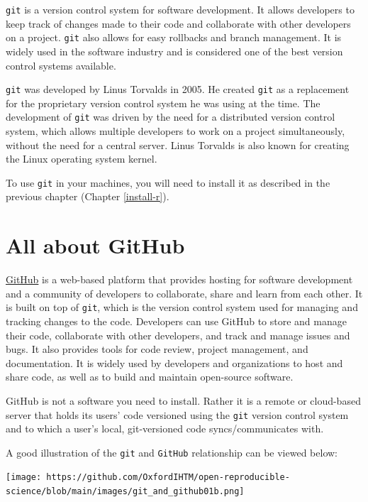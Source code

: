 \documentclass[
  12pt,
]{book}
\begin{document}
\texttt{git} is a version control system for software development. It allows developers to keep track of changes made to their code and collaborate with other developers on a project. \texttt{git} also allows for easy rollbacks and branch management. It is widely used in the software industry and is considered one of the best version control systems available.

\texttt{git} was developed by Linus Torvalds in 2005. He created \texttt{git} as a replacement for the proprietary version control system he was using at the time. The development of \texttt{git} was driven by the need for a distributed version control system, which allows multiple developers to work on a project simultaneously, without the need for a central server. Linus Torvalds is also known for creating the Linux operating system kernel.

To use \texttt{git} in your machines, you will need to install it as described in the previous chapter (Chapter \ref{install-r}).

\hypertarget{all-about-github}{%
\section{All about GitHub}\label{all-about-github}}

\href{https://github.com}{GitHub} is a web-based platform that provides hosting for software development and a community of developers to collaborate, share and learn from each other. It is built on top of \texttt{git}, which is the version control system used for managing and tracking changes to the code. Developers can use GitHub to store and manage their code, collaborate with other developers, and track and manage issues and bugs. It also provides tools for code review, project management, and documentation. It is widely used by developers and organizations to host and share code, as well as to build and maintain open-source software.

GitHub is not a software you need to install. Rather it is a remote or cloud-based server that holds its users' code versioned using the \texttt{git} version control system and to which a user's local, git-versioned code syncs/communicates with.

A good illustration of the \texttt{git} and \texttt{GitHub} relationship can be viewed below:

\texttt{[image: https://github.com/OxfordIHTM/open-reproducible-science/blob/main/images/git\_and\_github01b.png]}
\end{document}
